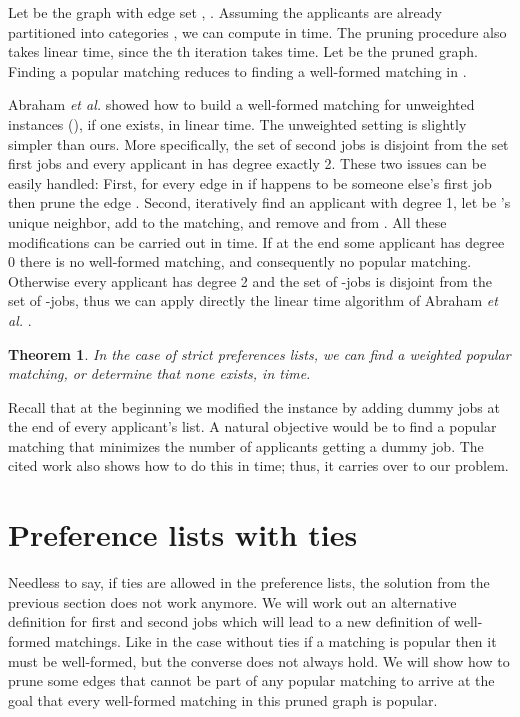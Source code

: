 \documentclass[11pt]{article}
\newcommand{\etal} {{\it et al. }}
\newtheorem{theorem}{Theorem}
\begin{document}
{Let  be the graph with edge set , . Assuming the applicants are already partitioned into categories , we can compute  in  time. The pruning procedure also takes linear time, since the th iteration takes  time. Let  be the pruned graph. Finding a popular matching reduces to finding a well-formed matching in .

Abraham \etal \cite{AIKM05} showed how to build a well-formed matching for unweighted instances (), if one exists, in linear time. The unweighted setting is slightly simpler than ours. More specifically, the set of second jobs is disjoint from the set first jobs and every applicant in  has degree exactly 2. These two issues can be easily handled: First, for every edge  in  if  happens to be someone else's first job then prune the edge . Second, iteratively find an applicant  with degree 1, let  be 's unique neighbor, add  to the matching, and remove  and  from . All these modifications can be carried out in  time. If at the end some applicant has degree 0 there is no well-formed matching, and consequently no popular matching. Otherwise every applicant has degree 2 and the set of -jobs is disjoint from the set of -jobs, thus we can apply directly the linear time algorithm of Abraham \etal \cite{AIKM05}.

\begin{theorem} In the case of strict preferences lists, we can find a weighted popular matching, or determine that none exists, in  time. \label{theorem:strict}
\end{theorem}

Recall that at the beginning we modified the instance by adding dummy jobs at the end of every applicant's list. A natural objective would be to find a popular matching that minimizes the number of applicants getting a dummy job. The cited work also shows how to do this in  time; thus, it carries over to our problem.

\section{Preference lists with ties}

Needless to say, if ties are allowed in the preference lists, the solution from the previous section does not work anymore. We will work out an alternative definition for first and second jobs which will lead to a new definition of well-formed matchings. Like in the case without ties if a matching is popular then it must be well-formed, but the converse does not always hold. We will show how to prune some edges that cannot be part of any popular matching to arrive at the goal that every well-formed matching in this pruned graph is popular.

}
\end{document}
